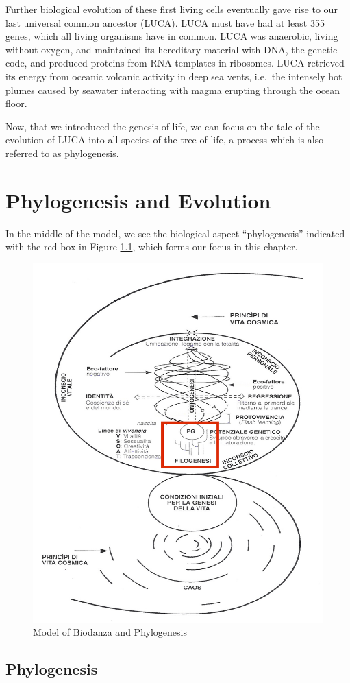 \documentclass[
  11pt,
]{book}
\begin{document}
Further biological evolution of these first living cells eventually gave rise to our last universal common ancestor (LUCA).
LUCA must have had at least 355 genes, which all living organisms have in common.
LUCA was anaerobic, living without oxygen, and maintained its hereditary material with DNA, the genetic code, and produced proteins from RNA templates in ribosomes. LUCA retrieved its energy from oceanic volcanic activity in deep sea vents, i.e.~the intensely hot plumes caused by seawater interacting with magma erupting through the ocean floor.

Now, that we introduced the genesis of life, we can focus on the tale of the evolution of LUCA into all species of the tree of life, a process which is also referred to as phylogenesis.

\hypertarget{phylogenesis-and-evolution}{%
\chapter{Phylogenesis and Evolution}\label{phylogenesis-and-evolution}}

In the middle of the model, we see the biological aspect ``phylogenesis'' indicated with the red box in Figure \ref{fig:modelPhylo}, which forms our focus in this chapter.

\begin{figure}

{\centering \includegraphics[width=0.5\linewidth]{./figs/biologischeAspectenBiodanzaDeelII} 

}

\caption{Model of Biodanza and Phylogenesis}\label{fig:modelPhylo}
\end{figure}

\hypertarget{phylogenesis}{%
\section{Phylogenesis}\label{phylogenesis}}
\end{document}
